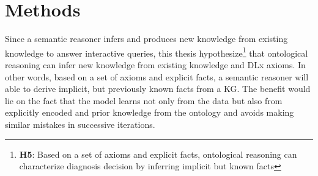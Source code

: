 \section{Methods}\label{chapter_8:mm}
Since a semantic reasoner infers and produces new knowledge from existing knowledge to answer interactive queries, this thesis hypothesize\footnote{\textbf{H5}: Based on a set of axioms and explicit facts, ontological reasoning can characterize diagnosis decision by inferring implicit but known facts} that ontological reasoning can infer new knowledge from existing knowledge and DLx axioms. In other words, based on a set of axioms and explicit facts, a semantic reasoner will able to derive implicit, but previously known facts from a KG. %
The benefit would lie on the fact that the model learns not only from the data but also from explicitly encoded and prior knowledge from the ontology and avoids making similar mistakes in successive iterations. %

